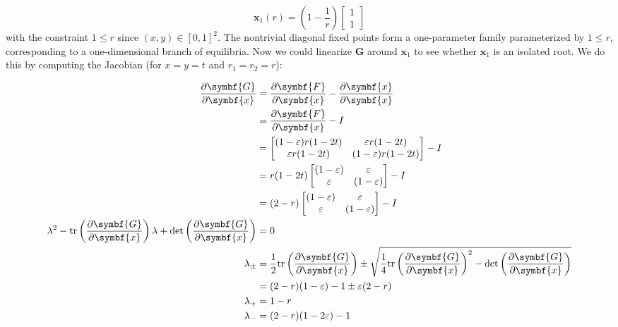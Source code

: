 \begin{equation}
	\symbf{x}_1(r) = \left(1 -\frac{1}{r}\right)
	\begin{bmatrix}
		1\\1
	\end{bmatrix}
\end{equation}
with the constraint $1\leq r$ since $(x, y) \in [0,1]^2$. The nontrivial diagonal fixed points form a one-parameter family
parameterized by $1\leq r$, corresponding to a one-dimensional branch of equilibria. Now we could linearize $\symbf{G}$ around
$\symbf{x}_1$ to see whether $\symbf{x}_1$ is an isolated root. We do this by computing the Jacobian (for $x = y = t$ and $r_1 = r_2 = r$):

\begin{align}
	\frac{\partial \symbf{G}}{\partial \symbf{x}} &= \frac{\partial \symbf{F}}{\partial \symbf{x}} - \frac{\partial \symbf{x}}{\partial \symbf{x}}\\
																								&= \frac{\partial \symbf{F}}{\partial \symbf{x}} - I\\
																								&= \begin{bmatrix}(1-\varepsilon)r(1-2t)&\varepsilon r(1 - 2t)\\
																									\varepsilon r(1 - 2t) & (1-\varepsilon)r(1-2t)
																									\end{bmatrix} - I\\
																								&=r(1-2t) 
																								\begin{bmatrix}(1-\varepsilon) & \varepsilon\\
																									\varepsilon & (1- \varepsilon)
																								\end{bmatrix} - I\\
																																							 &= (2-r)\begin{bmatrix}(1-\varepsilon) & \varepsilon\\
																									\varepsilon & (1- \varepsilon)
																								\end{bmatrix} - I\\
																									\lambda ^2 - {\rm tr}\left(\frac{\partial \symbf{G}}{\partial \symbf{x}}\right)\lambda + \det \left(\frac{\partial \symbf{G}}{\partial \symbf{x}}\right) &= 0\\
																									\lambda_{\pm} &=  \frac{1}{2}{\rm tr}\left(\frac{\partial \symbf{G}}{\partial \symbf{x}}\right) \pm \sqrt{ \frac{1}{4}{\rm tr}\left(\frac{\partial \symbf{G}}{\partial \symbf{x}}\right)^2 -  {\det}\left(\frac{\partial \symbf{G}}{\partial \symbf{x}}\right)}\\
																																&= (2 - r)(1-\varepsilon) - 1 \pm \varepsilon (2 - r)\\
																									\lambda_+&= 1-r\\
																									\lambda_-&=(2-r)(1-2\varepsilon) -1
\end{align}

